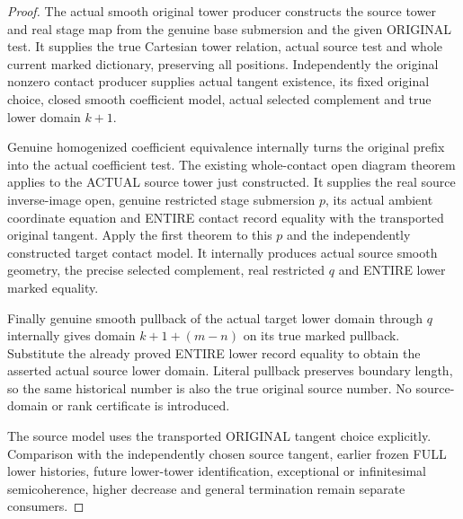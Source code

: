 \begin{proof}
The actual smooth original tower producer constructs the source tower and
real stage map from the genuine base submersion and the given ORIGINAL test.
It supplies the true Cartesian tower relation, actual source test and whole
current marked dictionary, preserving all positions. Independently the
original nonzero contact producer supplies actual tangent existence, its
fixed original choice, closed smooth coefficient model, actual selected
complement and true lower domain $k+1$.

Genuine homogenized coefficient equivalence internally turns the original
prefix into the actual coefficient test. The existing whole-contact open
diagram theorem applies to the ACTUAL source tower just constructed. It
supplies the real source inverse-image open, genuine restricted stage
submersion $p$, its actual ambient coordinate equation and ENTIRE contact
record equality with the transported original tangent. Apply the first
theorem to this $p$ and the independently constructed target contact model.
It internally produces actual source smooth geometry, the precise selected
complement, real restricted $q$ and ENTIRE lower marked equality.

Finally genuine smooth pullback of the actual target lower domain through
$q$ internally gives domain $k+1+(m-n)$ on its true marked pullback.
Substitute the already proved ENTIRE lower record equality to obtain the
asserted actual source lower domain. Literal pullback preserves boundary
length, so the same historical number is also the true original source
number. No source-domain or rank certificate is introduced.

The source model uses the transported ORIGINAL tangent choice explicitly.
Comparison with the independently chosen source tangent, earlier frozen
FULL lower histories, future lower-tower identification, exceptional or
infinitesimal semicoherence, higher decrease and general termination remain
separate consumers.
\end{proof}
